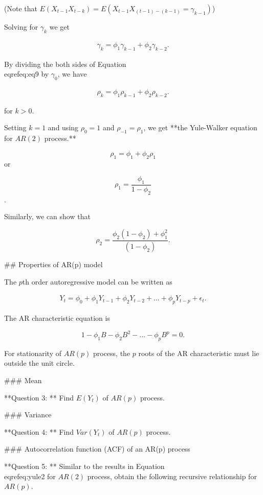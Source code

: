\documentclass[11pt,a4paper,]{article}
\begin{document}
{(Note that $E(X_{t-1}X_{t-k})=E(X_{t-1}X_{(t-1)-(k-1)}=\gamma_{k-1})$)

Solving for $\gamma_k$ we get

\begin{align}
\label{eq:eq9}
 \gamma_k=\phi_1\gamma_{k-1}+\phi_2\gamma_{k-2}.
\end{align}

By dividing the both sides of Equation \\eqref{eq:eq9} by $\gamma_0$, we have

\begin{align}
\label{eq:yule2}
 \rho_k=\phi_1\rho_{k-1}+\phi_2\rho_{k-2}.
\end{align}

for $k>0$. 

Setting $k=1$ and using $\rho_0=1$ and $\rho_{-1}=\rho_1$, we get **the Yule-Walker equation for $AR(2)$ process.**

$$\rho_1=\phi_1+\phi_2 \rho_1$$ or

$$\rho_1 = \frac{\phi_1}{1-\phi_2}$$.

Similarly, we can show that 

$$\rho_2 = \frac{\phi_2(1-\phi_2)+\phi_1^2}{(1-\phi_2)}.$$



## Properties of AR(p) model

The $p$th order autoregressive model can be written as

\begin{align}
Y_t = \phi_0 + \phi_1Y_{t-1}+\phi_2 Y_{t-2}+ ... + \phi_p Y_{t-p}+\epsilon_t.
\end{align}

The AR characteristic equation is 

$$1-\phi_1B-\phi_2B^2-...-\phi_pB^p=0.$$

For stationarity of $AR(p)$ process, the $p$ roots of the AR characteristic must lie outside the unit circle. 

### Mean

**Question 3: ** Find $E(Y_t)$ of $AR(p)$ process.
 
### Variance

**Question 4: ** Find $Var(Y_t)$ of $AR(p)$ process.


### Autocorrelation function (ACF) of an AR(p) process

**Question 5: ** Similar to the results in Equation \\eqref{eq:yule2} for $AR(2)$ process, obtain the following recursive relationship for $AR(p)$. 

}
\end{document}
